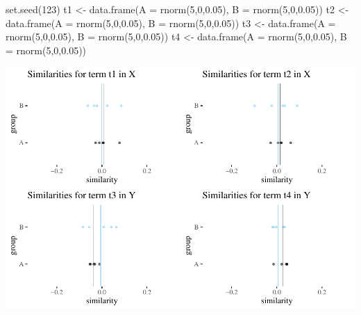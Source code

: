 \documentclass[
  10pt,
  dvipsnames,enabledeprecatedfontcommands]{scrartcl}
\newenvironment{Shaded}{\begin{snugshade}}{\end{snugshade}}
\newcommand{\AttributeTok}[1]{\textcolor[rgb]{0.77,0.63,0.00}{#1}}
\newcommand{\DecValTok}[1]{\textcolor[rgb]{0.00,0.00,0.81}{#1}}
\newcommand{\FloatTok}[1]{\textcolor[rgb]{0.00,0.00,0.81}{#1}}
\newcommand{\FunctionTok}[1]{\textcolor[rgb]{0.00,0.00,0.00}{#1}}
\newcommand{\NormalTok}[1]{#1}
\newcommand{\OtherTok}[1]{\textcolor[rgb]{0.56,0.35,0.01}{#1}}
\begin{document}
\begin{Shaded}
\begin{Highlighting}[]
\FunctionTok{set.seed}\NormalTok{(}\DecValTok{123}\NormalTok{)}
\NormalTok{t1 }\OtherTok{\textless{}{-}} \FunctionTok{data.frame}\NormalTok{(}\AttributeTok{A  =} \FunctionTok{rnorm}\NormalTok{(}\DecValTok{5}\NormalTok{,}\DecValTok{0}\NormalTok{,}\FloatTok{0.05}\NormalTok{), }\AttributeTok{B =} \FunctionTok{rnorm}\NormalTok{(}\DecValTok{5}\NormalTok{,}\DecValTok{0}\NormalTok{,}\FloatTok{0.05}\NormalTok{))}
\NormalTok{t2 }\OtherTok{\textless{}{-}} \FunctionTok{data.frame}\NormalTok{(}\AttributeTok{A  =} \FunctionTok{rnorm}\NormalTok{(}\DecValTok{5}\NormalTok{,}\DecValTok{0}\NormalTok{,}\FloatTok{0.05}\NormalTok{), }\AttributeTok{B =} \FunctionTok{rnorm}\NormalTok{(}\DecValTok{5}\NormalTok{,}\DecValTok{0}\NormalTok{,}\FloatTok{0.05}\NormalTok{))}
\NormalTok{t3 }\OtherTok{\textless{}{-}} \FunctionTok{data.frame}\NormalTok{(}\AttributeTok{A  =} \FunctionTok{rnorm}\NormalTok{(}\DecValTok{5}\NormalTok{,}\DecValTok{0}\NormalTok{,}\FloatTok{0.05}\NormalTok{), }\AttributeTok{B =} \FunctionTok{rnorm}\NormalTok{(}\DecValTok{5}\NormalTok{,}\DecValTok{0}\NormalTok{,}\FloatTok{0.05}\NormalTok{))}
\NormalTok{t4 }\OtherTok{\textless{}{-}} \FunctionTok{data.frame}\NormalTok{(}\AttributeTok{A  =} \FunctionTok{rnorm}\NormalTok{(}\DecValTok{5}\NormalTok{,}\DecValTok{0}\NormalTok{,}\FloatTok{0.05}\NormalTok{), }\AttributeTok{B =} \FunctionTok{rnorm}\NormalTok{(}\DecValTok{5}\NormalTok{,}\DecValTok{0}\NormalTok{,}\FloatTok{0.05}\NormalTok{))}
\end{Highlighting}
\end{Shaded}

\normalsize

\begin{center}\includegraphics[width=1\linewidth]{paperDraft_files/figure-latex/unnamed-chunk-2-1} \end{center}
\end{document}
